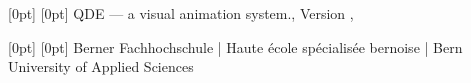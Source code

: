 \documentclass[
    a4paper,      %
    10pt,         %
    openright,    %
    notitlepage,  %
    parskip=half, %
]{scrreprt}       %
\theoremstyle{definition}                    %
\begin{document}

\providecommand{\titel}{QDE --- a visual animation system.}

  [0pt] %
  [0pt] %
  {} %
  {} %
  {} %
  {\color{bfhgrey} \footnotesize \titel, Version \vhCurrentVersion,
      \vhCurrentDate} %
  {} %
  {\color{bfhgrey} \thepage} %

  [0pt] %
  [0pt] %
  {} %
  {} %
  {} %
  {\color{bfhgrey}\fontsize{9pt}{10pt}\selectfont
    Berner Fachhochschule | Haute école spécialisée bernoise | Bern
    University of Applied Sciences} %
  {} %
  {} %


\pagestyle{newlayout}
\renewcommand{\chapterpagestyle}{newlayout}
\renewcommand{\chaptermark}[1]{\markboth{\thechapter.  #1}{}}
\renewcommand*{\headfont}{\normalfont}
\renewcommand*{\footfont}{\normalfont}

\setcounter{page}{1}




\tableofcontents
\cleardoublepage{}









\end{document}
